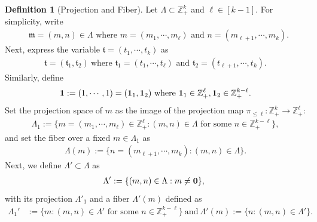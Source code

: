 \documentclass[11 pt,letterpaper]{amsart}
\theoremstyle{plain}
\theoremstyle{definition}
\newtheorem{definition}{Definition}\numberwithin{definition}{section}
\theoremstyle{remark} \theoremstyle{exam} \theoremstyle{ob}
\numberwithin{equation}{section}
\begin{document}
\begin{definition}[Projection and Fiber]\label{diid}
Let $\Lambda\subset \mathbb{Z}_+^k$ and $\ell \in [k-1]$. For simplicity,   write
\begin{align*}
& \mathfrak{m}=(m,n)\in \Lambda \text{ where $m=(m_1,\cdots,m_\ell)$ and $n=(m_{\ell+1},\cdots,m_k)$.} 
\end{align*}
Next, express the variable $\mathfrak{t}=(t_1,\cdots,t_k)$ as
\begin{align*}
\mathfrak{t}=(\mathfrak{t}_1, \mathfrak{t}_2)\ \text{where $\mathfrak{t}_1=(t_1,\cdots,t_\ell)$ and $\mathfrak{t}_2=(t_{\ell+1},\cdots,t_k)$}.
\end{align*}
Similarly, define
$${\bf 1}:=(1,\cdots,1)=({\bf 1}_1,{\bf 1}_2)\ \text{where}\ {\bf 1}_1\in \mathbb{Z}_+^\ell,{\bf 1}_2\in \mathbb{Z}_{+}^{k-\ell}. $$
Set  the projection space of $m$ as the image of the projection map $\pi_{\le \ell}:\mathbb{Z}_{+}^k\rightarrow \mathbb{Z}_{+}^{\ell}$:
\begin{align}\label{11pp}
\Lambda_{1}:=\{m=(m_1,\cdots,m_\ell) \in \mathbb{Z}_+^{\ell}:(m,n)\in \Lambda\text{ for some } n\in\mathbb{Z}_{+}^{k-\ell}\}, 
\end{align}
and set the fiber over a fixed $m\in \Lambda_{1}$ as 
\begin{align*}
\Lambda(m):=\{n=(m_{\ell+1},\cdots,m_k):  (m,n)\in \Lambda\}.
\end{align*}
Next, we  define $\Lambda'\subset\Lambda$ as
\begin{align} \label{desi1}
\Lambda':=  
\{ (m,n)\in\Lambda: m\ne {\bf 0}\}, \  
\end{align}
with its projection 
  $\Lambda'_{1}$ and a fiber $\Lambda'(m)$ defined as \begin{align*}
	\Lambda_{1}' &:=\{m: (m,n)\in \Lambda' \text{ for some } n\in\mathbb{Z}_{+}^{k-\ell}\} \ \text{and}\ \Lambda'(m):= \{ n: (m,n)\in \Lambda' \}.
\end{align*} 
\end{definition}
\end{document}
